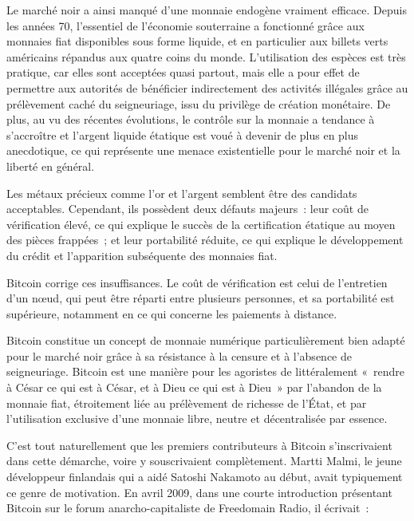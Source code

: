 Le marché noir a ainsi manqué d'une monnaie endogène vraiment efficace. Depuis les années 70, l'essentiel de l'économie souterraine a fonctionné grâce aux monnaies fiat disponibles sous forme liquide, et en particulier aux billets verts américains répandus aux quatre coins du monde. L'utilisation des espèces est très pratique, car elles sont acceptées quasi partout, mais elle a pour effet de permettre aux autorités de bénéficier indirectement des activités illégales grâce au prélèvement caché du seigneuriage, issu du privilège de création monétaire. De plus, au vu des récentes évolutions, le contrôle sur la monnaie a tendance à s'accroître et l'argent liquide étatique est voué à devenir de plus en plus anecdotique, ce qui représente une menace existentielle pour le marché noir et la liberté en général.

Les métaux précieux comme l'or et l'argent semblent être des candidats acceptables. Cependant, ils possèdent deux défauts majeurs~: leur coût de vérification élevé, ce qui explique le succès de la certification étatique au moyen des pièces frappées~; et leur portabilité réduite, ce qui explique le développement du crédit et l'apparition subséquente des monnaies fiat.

Bitcoin corrige ces insuffisances. Le coût de vérification est celui de l'entretien d'un nœud, qui peut être réparti entre plusieurs personnes, et sa portabilité est supérieure, notamment en ce qui concerne les paiements à distance.

Bitcoin constitue un concept de monnaie numérique particulièrement bien adapté pour le marché noir grâce à sa résistance à la censure et à l'absence de seigneuriage. Bitcoin est une manière pour les agoristes de littéralement «~rendre à César ce qui est à César, et à Dieu ce qui est à Dieu~» par l'abandon de la monnaie fiat, étroitement liée au prélèvement de richesse de l'État, et par l'utilisation exclusive d'une monnaie libre, neutre et décentralisée par essence.

C'est tout naturellement que les premiers contributeurs à Bitcoin s'inscrivaient dans cette démarche, voire y souscrivaient complètement. Martti Malmi, le jeune développeur finlandais qui a aidé Satoshi Nakamoto au début, avait typiquement ce genre de motivation. En avril 2009, dans une courte introduction présentant Bitcoin sur le forum anarcho-capitaliste de Freedomain Radio, il écrivait~:

